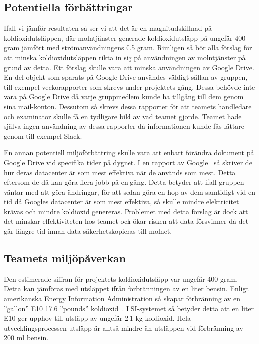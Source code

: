 \subsection{Potentiella förbättringar}
Ifall vi jämför resultaten så ser vi att det är en magnitudskillnad på koldioxidutsläppen, där molntjänster generade koldioxidutsläpp på ungefär 400 gram jämfört med strömanvändningens 0.5 gram. Rimligen så bör alla förslag för att minska koldioxidutsläppen rikta in sig på användningen av molntjänster på grund av detta. Ett förslag skulle vara att minska användningen av Google Drive. En del objekt som sparats på Google Drive användes väldigt sällan av gruppen, till exempel veckorapporter som skrevs under projektets gång. Dessa behövde inte vara på Google Drive då varje gruppmedlem kunde ha tillgång till dem genom sina mail-konton. Dessutom så skrevs dessa rapporter för att teamets handledare och examinator skulle få en tydligare bild av vad teamet gjorde. Teamet hade själva ingen användning av dessa rapporter då informationen kunde fås lättare genom till exempel Slack. 

En annan potentiell miljöförbättring skulle vara att enbart förändra dokument på Google Drive vid specifika tider på dygnet. I en rapport av Google~\cite{google-warehouse} så skriver de hur deras datacenter är som mest effektiva när de används som mest. Detta eftersom de då kan göra flera jobb på en gång. Detta betyder att ifall gruppen väntar med att göra ändringar, för att sedan göra en hop av dem samtidigt vid en tid då Googles datacenter är som mest effektiva, så skulle mindre elektricitet krävas och mindre koldioxid genereras. Problemet med detta förslag är dock att det minskar effektiviteten hos teamet och ökar risken att data försvinner då det går längre tid innan data  säkerhetskopieras till molnet.


\subsection{Teamets miljöpåverkan}
\label{joel_a-disc-team}
Den estimerade siffran för projektets koldioxidutsläpp var ungefär 400 gram. Detta kan jämföras med utsläppet ifrån förbränningen av en liter bensin. Enligt amerikanska Energy Information Administration så skapar förbränning av en ''gallon'' E10 17.6 ''pounds'' koldioxid~\cite{co2-bensin}. I SI-systemet så betyder detta att en liter E10 ger upphov till utsläpp av ungefär 2.1 kg koldioxid. Hela utvecklingsprocessen  utsläpp är alltså mindre än utsläppen vid förbränning av 200 ml bensin. 

